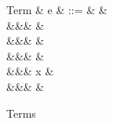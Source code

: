 \begin{figure}[H]
\begin{syntaxfig}
\mbox{Term}
&
e
&
::=
&
&
\\
&&&
&
\\
&&&
\exNil
&
\\
&&&
&
\\
&&&
x
&
\\
&&&
\exOp{\primOp}
&
\end{syntaxfig}
\caption{Terms}
\end{figure}
